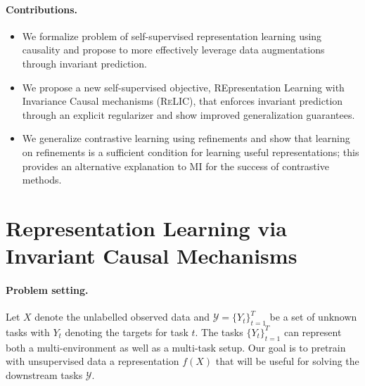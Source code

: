 \documentclass{article}
\newcommand{\relic}{\textsc{ReLIC}}
\begin{document}
\paragraph{Contributions.}
\begin{itemize}
    \item We formalize problem of self-supervised representation learning using causality and propose to more effectively leverage data augmentations through invariant prediction.
    
    \item We propose a new self-supervised objective, REpresentation Learning with Invariance Causal mechanisms (\relic), that enforces invariant prediction through an explicit regularizer and show improved generalization guarantees. 

    \item We generalize contrastive learning using refinements and show that learning on refinements is a sufficient condition for learning useful representations; this provides an alternative explanation to MI for the success of contrastive methods.
    
\end{itemize}
 \section{Representation Learning via Invariant Causal Mechanisms} \label{sec:framework}

\paragraph{Problem setting.} Let $X$ denote the unlabelled observed data and $\mathcal{Y} = \{Y_t\}_{t=1}^{T}$ be a set of unknown tasks with $Y_t$ denoting the targets for task $t$. 
The tasks $\{Y_t\}_{t=1}^{T}$ can represent both a multi-environment as well as a multi-task setup.
Our goal is to pretrain with unsupervised data a representation $f(X)$ that will be useful for solving the downstream tasks $\mathcal{Y}$.
\end{document}

